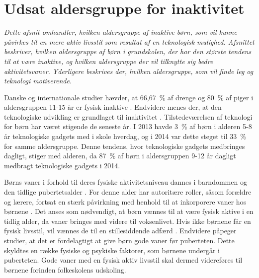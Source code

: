\section {Udsat aldersgruppe for inaktivitet}
\textit{Dette afsnit omhandler, hvilken aldersgruppe af inaktive børn, som vil kunne påvirkes til en mere aktiv livsstil som resultat af en teknologisk mulighed. Afsnittet beskriver, hvilken aldersgruppe af børn i grundskolen, der har den største tendens til at være inaktive, og hvilken aldersgruppe der vil tilknytte sig bedre aktivitetsvaner. Yderligere beskrives der, hvilken aldersgruppe, som vil finde leg og teknologi motiverende.}

Danske og internationale studier hævder, at 66,67~\% af drenge og 80~\% af piger i aldersgruppen 11-15 år er fysisk inaktive \citep{SundhedsstyrrelsenFaktaark}. 
Endvidere menes der, at den teknologiske udvikling er grundlaget til inaktivitet \citep{Kiens2007}. Tilstedeværelsen af teknologi for børn har været stigende de seneste år. I 2013 havde 3~\% af børn i alderen 5-8 år teknologiske gadgets med i skole hverdag, og i 2014 var dette steget til 33~\% for samme aldersgruppe. Denne tendens, hvor teknologiske gadgets medbringes dagligt, stiger med alderen, da 87~\% af børn i aldersgruppen 9-12 år dagligt medbragt teknologiske gadgets i 2014. \citep{GjensidigeForsikring2014}

Børns vaner i forhold til deres fysiske aktivitetsniveau dannes i barndommen og den tidlige pubertetsalder \citep{F.SallisG.Simons-MortonJ.Stone1992}. For denne alder har autoritære roller, såsom forældre og lærere, fortsat en stærk påvirkning med henhold til at inkorporere vaner hos børnene \citep{L.MeyerP.Gullotta2012}. \newline
Det anses som nødvendigt, at børn vænnes til at være fysisk aktive i en tidlig alder, da vaner bringes med videre til voksenlivet. Hvis ikke børnene får en fysisk livsstil, vil vænnes de til en stillesiddende adfærd \citep{Nabe-NielsenSundhedsministerietetal.2005,P.J.KremersBrug2008,L.MeyerP.Gullotta2012}. Endvidere påpeger studier, at det er fordelagtigt at give børn gode vaner før puberteten. Dette skyldtes en række fysiske og psykiske faktorer, som børnene undergår i puberteten. Gode vaner med en fysisk aktiv livsstil skal dermed videreføres til børnene forinden folkeskolens udskoling. 

